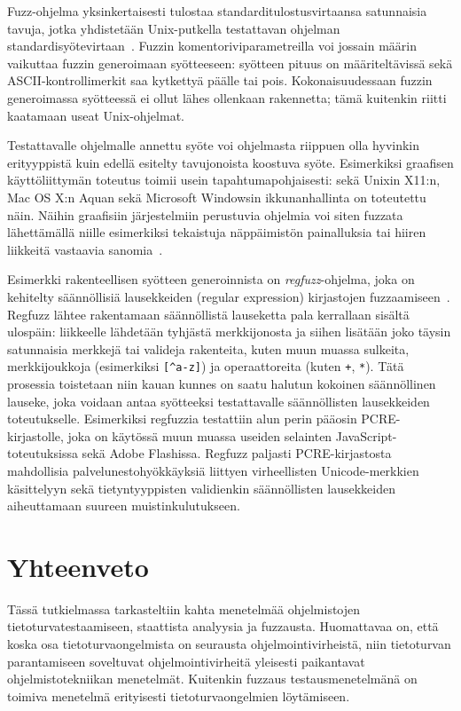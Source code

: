 Fuzz-ohjelma yksinkertaisesti tulostaa standarditulostusvirtaansa satunnaisia tavuja,
jotka yhdistetään Unix-putkella testattavan ohjelman standardisyötevirtaan~\cite{UnixReliability}.
Fuzzin komentoriviparametreilla voi jossain määrin vaikuttaa fuzzin generoimaan syötteeseen:
syötteen pituus on määriteltävissä sekä ASCII-kontrollimerkit saa kytkettyä päälle tai pois.
Kokonaisuudessaan fuzzin generoimassa syötteessä ei ollut lähes ollenkaan rakennetta;
tämä kuitenkin riitti kaatamaan useat Unix-ohjelmat.

Testattavalle ohjelmalle annettu syöte voi ohjelmasta riippuen olla
hyvinkin erityyppistä kuin edellä esitelty tavujonoista koostuva syöte.
Esimerkiksi graafisen käyttöliittymän toteutus toimii usein tapahtumapohjaisesti:
sekä Unixin X11:n, Mac OS X:n Aquan sekä Microsoft Windowsin ikkunanhallinta on toteutettu näin.
Näihin graafisiin järjestelmiin perustuvia ohjelmia voi siten fuzzata lähettämällä
niille esimerkiksi tekaistuja näppäimistön painalluksia tai hiiren liikkeitä vastaavia
sanomia~\cite{X11Fuzz,MacOsFuzz,WinNtFuzz}.

Esimerkki rakenteellisen syötteen generoinnista on \emph{regfuzz}-ohjelma,
joka on kehitelty säännöllisiä lausekkeiden (regular expression) kirjastojen
fuzzaamiseen~\cite{RegFuzz}.
Regfuzz lähtee rakentamaan säännöllistä lauseketta pala kerrallaan sisältä ulospäin:
liikkeelle lähdetään tyhjästä merkkijonosta ja siihen lisätään joko täysin
satunnaisia merkkejä tai valideja rakenteita,
kuten muun muassa sulkeita, merkkijoukkoja (esimerkiksi \texttt{[\^{}a-z]}) ja
operaattoreita (kuten \texttt{+}, \texttt{*}).
Tätä prosessia toistetaan niin kauan kunnes on saatu halutun kokoinen säännöllinen lauseke,
joka voidaan antaa syötteeksi testattavalle säännöllisten lausekkeiden toteutukselle.
Esimerkiksi regfuzzia testattiin alun perin pääosin PCRE-kirjastolle,
joka on käytössä muun muassa useiden selainten JavaScript-toteutuksissa sekä Adobe Flashissa.
Regfuzz paljasti PCRE-kirjastosta mahdollisia palvelunestohyökkäyksiä liittyen
virheellisten Unicode-merkkien käsittelyyn sekä tietyntyyppisten validienkin
säännöllisten lausekkeiden aiheuttamaan suureen muistinkulutukseen.

\section{Yhteenveto}
Tässä tutkielmassa tarkasteltiin kahta menetelmää ohjelmistojen tietoturvatestaamiseen,
staattista analyysia ja fuzzausta.
Huomattavaa on, että koska osa tietoturvaongelmista on seurausta ohjelmointivirheistä,
niin tietoturvan parantamiseen soveltuvat ohjelmointivirheitä yleisesti paikantavat ohjelmistotekniikan menetelmät.
Kuitenkin fuzzaus testausmenetelmänä on toimiva menetelmä erityisesti tietoturvaongelmien löytämiseen.
\fixme[kirjoita]
